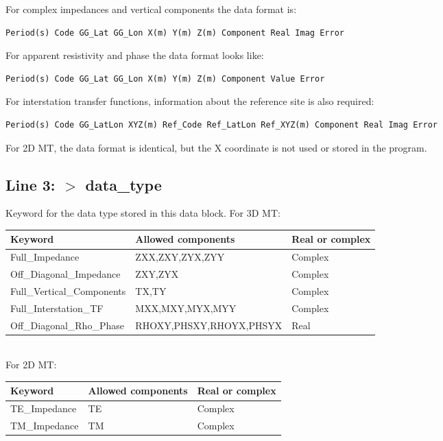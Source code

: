 \documentclass[12pt]{article}
\begin{document}
For complex impedances and vertical components the data format is:
\begin{verbatim}
Period(s) Code GG_Lat GG_Lon X(m) Y(m) Z(m) Component Real Imag Error
\end{verbatim}

For apparent resistivity and phase the data format looks like:
\begin{verbatim}
Period(s) Code GG_Lat GG_Lon X(m) Y(m) Z(m) Component Value Error
\end{verbatim}

For interstation transfer functions, information about the reference site is also required:
\begin{verbatim}
Period(s) Code GG_LatLon XYZ(m) Ref_Code Ref_LatLon Ref_XYZ(m) Component Real Imag Error
\end{verbatim}

For 2D MT, the data format is identical, but the X coordinate is not used or stored in the program.

\subsection*{Line 3: $>$ data\_type}
Keyword for the data type stored in this data block. For 3D MT:\\

\noindent
\begin{tabular}{|p{5cm}|p{7.5cm}|p{3.5cm}|}
  \hline
  Keyword & Allowed components & Real or complex \\
  \hline
  Full\_Impedance & ZXX,ZXY,ZYX,ZYY & Complex \\
  Off\_Diagonal\_Impedance & ZXY,ZYX & Complex \\
  Full\_Vertical\_Components & TX,TY & Complex \\
  Full\_Interstation\_TF & MXX,MXY,MYX,MYY & Complex \\
  Off\_Diagonal\_Rho\_Phase & RHOXY,PHSXY,RHOYX,PHSYX & Real \\
  \hline
\end{tabular}\\

\noindent
For 2D MT:\\
\noindent
\begin{tabular}{|p{5cm}|p{7.5cm}|p{3.5cm}|}
  \hline
  Keyword & Allowed components & Real or complex \\
  \hline
  TE\_Impedance & TE & Complex \\
  TM\_Impedance & TM & Complex \\
  \hline
\end{tabular}\\
\end{document}
